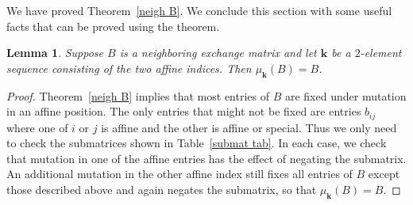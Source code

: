 \documentclass{amsart}
\newtheorem{lemma}[proposition]{Lemma}
\theoremstyle{definition}
\theoremstyle{remark}
\numberwithin{equation}{section}
\newcommand{\0}{{\mathbf{0}}}
\newcommand{\kk}{{\boldsymbol{k}}}
\begin{document}
We have proved Theorem~\ref{neigh B}.
We conclude this section with some useful facts that can be proved using the theorem.

\begin{lemma}\label{affine mut}
Suppose $B$ is a neighboring exchange matrix and let $\kk$ be a $2$-element sequence consisting of the two affine indices. 
Then $\mu_\kk(B)=B$.
\end{lemma}
\begin{proof}
Theorem~\ref{neigh B} implies that most entries of $B$ are fixed under mutation in an affine position.
The only entries that might not be fixed are entries $b_{ij}$ where one of $i$ or $j$ is affine and the other is affine or special.
Thus we only need to check the submatrices shown in Table~\ref{submat tab}.
In each case, we check that mutation in one of the affine entries has the effect of negating the submatrix.
An additional mutation in the other affine index still fixes all entries of $B$ except those described above and again negates the submatrix, so that $\mu_\kk(B)=B$.  

\end{proof}
\end{document}
